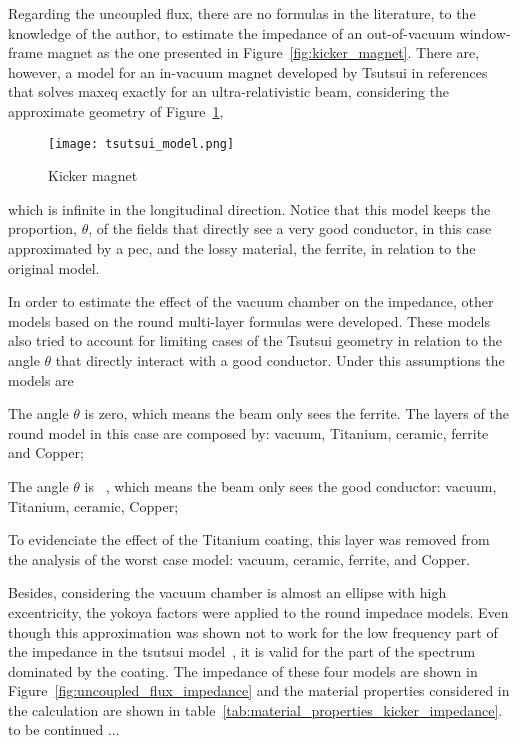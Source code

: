     Regarding the uncoupled flux, there are no formulas in the literature, to the knowledge of the author, to estimate the impedance of an out-of-vacuum window-frame magnet as the one presented in Figure~\ref{fig:kicker_magnet}. There are, however, a model for an in-vacuum magnet developed by Tsutsui in references~\cite{Tsutsui1999,Tsutsui1998,Salvant2010b} that solves \gls{maxeq} exactly for an ultra-relativistic beam, considering the approximate geometry of Figure~\ref{fig:tsutsui_model},
    \begin{figure}[b!]
        \centering
        \texttt{[image: tsutsui\_model.png]}
        \caption{Kicker magnet}
        \label{fig:tsutsui_model}
    \end{figure}
    which is infinite in the longitudinal direction. Notice that this model keeps the proportion, $\theta$, of the fields that directly see a very good conductor, in this case approximated by a \gls{pec}, and the lossy material, the ferrite, in relation to the original model.

    In order to estimate the effect of the vacuum chamber on the impedance, other models based on the round multi-layer formulas were developed. These models also tried to account for limiting cases of the Tsutsui geometry in relation to the angle $\theta$ that directly interact with a good conductor. Under this assumptions the models are
    \begin{description}[align=left]
        \item[Worst case:] The angle $\theta$ is zero, which means the beam only sees the ferrite. The layers of the round model in this case are composed by: vacuum, Titanium, ceramic, ferrite and Copper;
        \item[Best case:] The angle $\theta$ is \si{\pi{}}, which means the beam only sees the good conductor: vacuum, Titanium, ceramic, Copper;
        \item[No Coating:] To evidenciate the effect of the Titanium coating, this layer was removed from the analysis of the worst case model: vacuum, ceramic, ferrite, and Copper.
    \end{description}
    Besides, considering the vacuum chamber is almost an ellipse with high excentricity, the yokoya factors were applied to the round impedace models. Even though this approximation was shown not to work for the low frequency part of the impedance in the tsutsui model~\cite{Salvant2010b}, it is valid for the part of the spectrum dominated by the coating. The impedance of these four models are shown in Figure~\ref{fig:uncoupled_flux_impedance} and the material properties considered in the calculation are shown in table~\ref{tab:material_properties_kicker_impedance}. {\huge to be continued ...}

